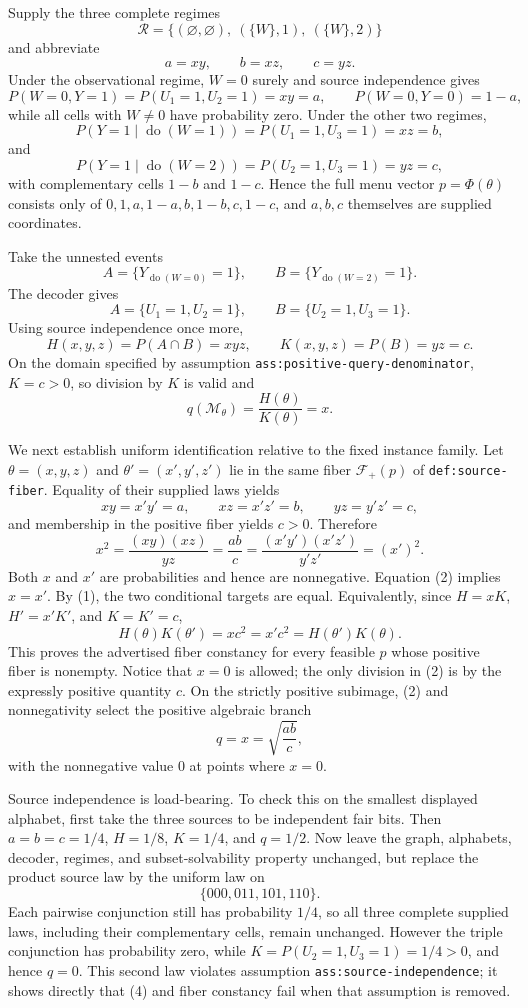Supply the three complete regimes
\[
 \mathcal R=\bigl\{(\varnothing,\varnothing),\ (\{W\},1),\ (\{W\},2)\bigr\}
\]
and abbreviate
\[
 a=xy,\qquad b=xz,\qquad c=yz.
\]
Under the observational regime, \(W=0\) surely and source independence gives
\[
 P(W=0,Y=1)=P(U_1=1,U_2=1)=xy=a,
 \qquad P(W=0,Y=0)=1-a,
\]
while all cells with \(W\neq0\) have probability zero.  Under the other two regimes,
\[
 P(Y=1\mid\operatorname{do}(W=1))=P(U_1=1,U_3=1)=xz=b,
\]
and
\[
 P(Y=1\mid\operatorname{do}(W=2))=P(U_2=1,U_3=1)=yz=c,
\]
with complementary cells \(1-b\) and \(1-c\).  Hence the full menu vector \(p=\Phi(\theta)\) consists only of \(0,1,a,1-a,b,1-b,c,1-c\), and \(a,b,c\) themselves are supplied coordinates.

Take the unnested events
\[
 A=\{Y_{\operatorname{do}(W=0)}=1\},
 \qquad
 B=\{Y_{\operatorname{do}(W=2)}=1\}.
\]
The decoder gives
\[
 A=\{U_1=1,U_2=1\},
 \qquad
 B=\{U_2=1,U_3=1\}.
\]
Using source independence once more,
\[
 H(x,y,z)=P(A\cap B)=xyz,
 \qquad
 K(x,y,z)=P(B)=yz=c.
\]
On the domain specified by assumption \texttt{ass:positive-query-denominator}, \(K=c>0\), so division by \(K\) is valid and
\[
 q(\mathcal M_\theta)=\frac{H(\theta)}{K(\theta)}=x. \tag{1}
\]

We next establish uniform identification relative to the fixed instance family.  Let \(\theta=(x,y,z)\) and \(\theta'=(x',y',z')\) lie in the same fiber \(\mathcal F_+(p)\) of \texttt{def:source-fiber}.  Equality of their supplied laws yields
\[
 xy=x'y'=a,\qquad xz=x'z'=b,\qquad yz=y'z'=c,
\]
and membership in the positive fiber yields \(c>0\).  Therefore
\[
 x^2=\frac{(xy)(xz)}{yz}=\frac{ab}{c}
     =\frac{(x'y')(x'z')}{y'z'}=(x')^2. \tag{2}
\]
Both \(x\) and \(x'\) are probabilities and hence are nonnegative.  Equation (2) implies \(x=x'\).  By (1), the two conditional targets are equal.  Equivalently, since \(H=xK\), \(H'=x'K'\), and \(K=K'=c\),
\[
 H(\theta)K(\theta')=xc^2=x'c^2=H(\theta')K(\theta). \tag{3}
\]
This proves the advertised fiber constancy for every feasible \(p\) whose positive fiber is nonempty.  Notice that \(x=0\) is allowed; the only division in (2) is by the expressly positive quantity \(c\).  On the strictly positive subimage, (2) and nonnegativity select the positive algebraic branch
\[
 q=x=\sqrt{\frac{ab}{c}}, \tag{4}
\]
with the nonnegative value \(0\) at points where \(x=0\).

Source independence is load-bearing.  To check this on the smallest displayed alphabet, first take the three sources to be independent fair bits.  Then \(a=b=c=1/4\), \(H=1/8\), \(K=1/4\), and \(q=1/2\).  Now leave the graph, alphabets, decoder, regimes, and subset-solvability property unchanged, but replace the product source law by the uniform law on
\[
 \{000,011,101,110\}.
\]
Each pairwise conjunction still has probability \(1/4\), so all three complete supplied laws, including their complementary cells, remain unchanged.  However the triple conjunction has probability zero, while \(K=P(U_2=1,U_3=1)=1/4>0\), and hence \(q=0\).  This second law violates assumption \texttt{ass:source-independence}; it shows directly that (4) and fiber constancy fail when that assumption is removed.


